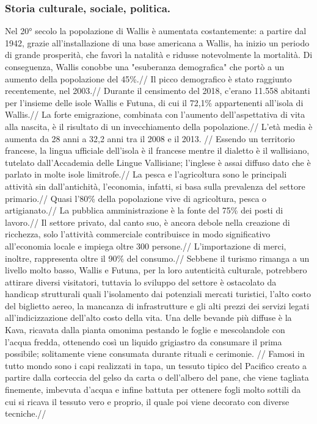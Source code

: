\documentclass[fleqn,10pt]{SelfArx} %
\begin{document}
\subsubsection{Storia culturale, sociale, politica.}
Nel 20° secolo la popolazione di Wallis è aumentata costantemente: a partire dal 1942, grazie all'installazione di una base americana a Wallis, ha inizio un periodo di grande prosperità, che favorì la natalità e ridusse notevolmente la mortalità. Di conseguenza, Wallis conobbe una "esuberanza demografica" che portò a un aumento della popolazione del 45\%.//
Il picco demografico è stato raggiunto recentemente, nel 2003.//
Durante il censimento del 2018, c'erano 11.558 abitanti per l'insieme delle isole Wallis e Futuna, di cui il 72,1\% appartenenti all'isola di Wallis.//
La forte emigrazione, combinata con l'aumento dell'aspettativa di vita alla nascita, è il risultato di un invecchiamento della popolazione.// 
L'età media è aumenta da 28 anni a 32,2 anni tra il 2008 e il 2013. //
Essendo un territorio francese, la lingua ufficiale dell'isola è il francese mentre il dialetto è il wallisiano, tutelato dall'Accademia delle Lingue Vallisiane; l'inglese è assai diffuso dato che è parlato in molte isole limitrofe.//
La pesca e l'agricoltura sono le principali attività sin dall'antichità, l'economia, infatti, si basa sulla prevalenza del settore primario.//
Quasi l'80\% della popolazione vive di agricoltura, pesca o artigianato.// 
La pubblica amministrazione è la fonte del 75\% dei posti di lavoro.// 
Il settore privato, dal canto suo, è ancora debole nella creazione di ricchezza, solo l'attività commerciale contribuisce in modo significativo all'economia locale e  impiega oltre 300 persone.//
L'importazione di merci, inoltre, rappresenta oltre il 90\% del consumo.//
Sebbene il turismo rimanga a un livello molto basso, Wallis e Futuna, per la loro autenticità culturale, potrebbero attirare diversi  visitatori, tuttavia lo sviluppo del settore è ostacolato da handicap strutturali quali l'isolamento dai potenziali mercati turistici, l'alto costo del biglietto aereo, la mancanza di infrastrutture e gli alti prezzi dei servizi legati all'indicizzazione dell'alto costo della vita.
Una delle bevande più diffuse è la Kava, ricavata dalla pianta omonima pestando le foglie e mescolandole con l'acqua fredda, ottenendo così un liquido grigiastro da consumare il prima possibile; solitamente viene consumata durante rituali e cerimonie. //
Famosi in tutto mondo sono i capi realizzati in tapa, un tessuto tipico del Pacifico creato a partire dalla corteccia del gelso da carta o dell'albero del pane, che viene tagliata finemente, imbevuta d'acqua e infine battuta per ottenere fogli molto sottili da cui si ricava il tessuto vero e proprio, il quale poi viene decorato con diverse tecniche.//
\end{document}
